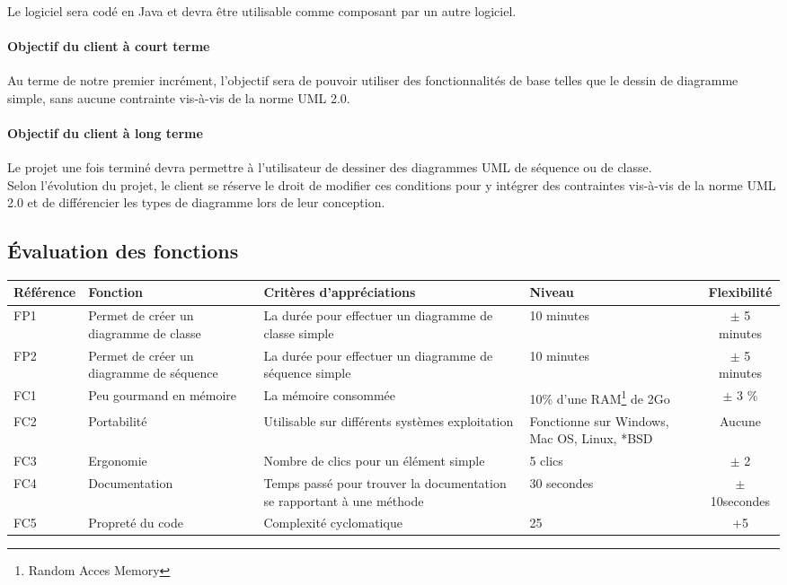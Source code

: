 \documentclass[12pt,a4paper,openany]{article}
\begin{document}
	\paragraph{}
		Le logiciel sera codé en Java et devra être utilisable comme composant par un autre logiciel.\\
	\paragraph{Objectif du client à court terme} Au terme de notre premier incrément, l'objectif sera
	de pouvoir utiliser des fonctionnalités de base telles que le dessin de diagramme simple, sans aucune
	contrainte vis-à-vis de la norme UML 2.0.
	\paragraph{Objectif du client à long terme}
	Le projet une fois terminé devra permettre à l'utilisateur de dessiner des diagrammes UML de séquence ou de classe.\\
	Selon l'évolution du projet, le client se réserve le droit de modifier ces conditions pour y
	intégrer des contraintes vis-à-vis de la norme UML 2.0 et de différencier les types de diagramme lors de leur conception. 
	
	\subsection{Évaluation des fonctions}
	\begin{tabular}{|p{2cm}|p{3cm}|p{5cm}|p{3cm}|c|}
		\hline
		\textbf{Référence}& \textbf{Fonction} & \textbf{Critères d'appréciations} & \textbf{Niveau} & \textbf{Flexibilité} \\
		\hline
			FP1 & Permet de créer un diagramme de classe & La durée pour effectuer un diagramme de classe simple & 10 minutes & $\pm$ 5 minutes\\
		\hline
			FP2 & Permet de créer un diagramme de séquence & La durée pour effectuer un diagramme de séquence simple & 10 minutes & $\pm$ 5 minutes\\
		\hline
			FC1 & Peu gourmand en mémoire & La mémoire consommée & 10\% d'une RAM\footnote{Random Acces Memory} de 2Go & $\pm$ 3 \%\\
		\hline
			FC2 & Portabilité & Utilisable sur différents systèmes exploitation & Fonctionne sur Windows, Mac OS, Linux, *BSD & Aucune \\
		\hline
			FC3 & Ergonomie & Nombre de clics pour un élément simple & 5 clics & $\pm$ 2\\
		\hline
			FC4 & Documentation & Temps passé pour trouver la documentation se rapportant à une méthode &30 secondes& $\pm$10secondes \\ 
		\hline
			FC5 & Propreté du code & Complexité cyclomatique& 25 & +5\\ 
		\hline
	\end{tabular}
\end{document}

